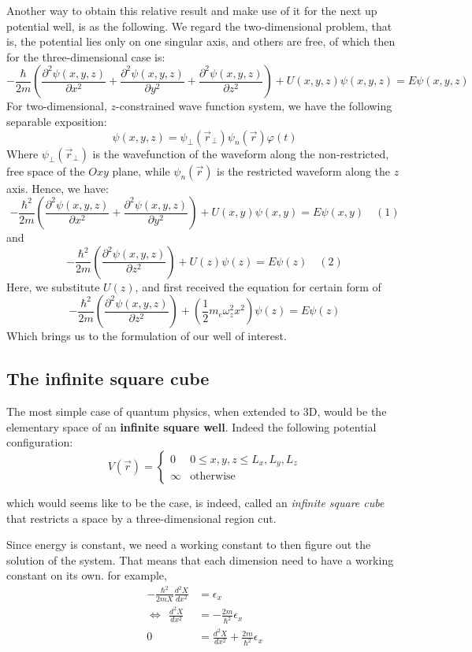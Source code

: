 Another way to obtain this relative result and make use of it for the next up potential well, is as the following. We regard the two-dimensional problem, that is, the potential lies only on one singular axis, and others are free, of which then for the three-dimensional case is: 
$$-\frac{\hbar}{2m}\left( \frac{\partial^{2}\psi(x,y,z)}{\partial x^{2}} + \frac{\partial^{2}\psi(x,y,z)}{\partial y^{2}} + \frac{\partial^{2}\psi(x,y,z)}{\partial z^{2}} \right)+ U(x,y,z)\psi(x,y,z)= E\psi(x,y,z)$$
For two-dimensional, $z$-constrained wave function system, we have the following separable exposition: 
$$\psi(x,y,z)=\psi_{\perp}(\vec{r}_{\perp})\psi_{n}(\vec{r})\varphi(t)$$
Where $\psi_{\perp}(\vec{r}_{\perp})$ is the wavefunction of the waveform along the non-restricted, free space of the $Oxy$ plane, while $\psi_{n}(\vec{r})$ is the restricted waveform along the $z$ axis. 
Hence, we have: 
$$
-\frac{\hbar^{2}}{2m} \left(\frac{\partial^{2}\psi(x,y,z)}{\partial x^{2}}+\frac{\partial^{2}\psi(x,y,z)}{\partial y^{2}}\right) + U(x,y)\psi(x,y) = E\psi(x,y)\quad (1)
$$
and $$-\frac{\hbar^{2}}{2m}\left(\frac{\partial^{2}\psi(x,y,z)}{\partial z^{2}}\right)+U(z)\psi(z)=E\psi(z)\quad (2)$$
Here, we substitute $U(z)$, and first received the equation for certain form of $$-\frac{\hbar^{2}}{2m}\left(\frac{\partial^{2}\psi(x,y,z)}{\partial z^{2}}\right)+\left( \frac{1}{2}m_{e}\omega_{z}^{2}x^{2} \right)\psi(z)=E\psi(z)$$
Which brings us to the formulation of our well of interest. 
\subsection{The infinite square cube}

The most simple case of quantum physics, when extended to 3D, would be the elementary space of an \textbf{infinite square well}. Indeed the following potential configuration: 
\begin{equation}
  V(\vec{r}) = \begin{cases}
    0 & 0 \leq x,y,z \leq L_{x},L_{y},L_{z} \\
    \infty & \text{otherwise}
    \end{cases}
\end{equation}

which would seems like to be the case, is indeed, called an \textit{infinite square cube} that restricts a space by a three-dimensional region cut. 

Since energy is constant, we need a working constant to then figure out the solution of the system. That means that each dimension need to have a working constant on its own. for example, 
\begin{equation*}
  \begin{split}
    -\frac{\hbar^{2}}{2mX} \frac{d^{2}X}{dx^{2}} & = \epsilon_{x}\\ 
    \Leftrightarrow \: \:\frac{d^{2}X}{dx^{2}} & = -\frac{2m}{\hbar^{2}} \epsilon_{x}\\
    0  & = \frac{d^{2}X}{dx^{2}}+ \frac{2m}{\hbar^{2}}\epsilon_{x}
    \end{split}
\end{equation*}

